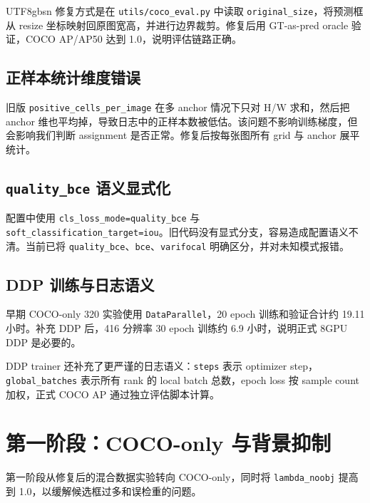 \documentclass[11pt,a4paper]{article}
\begin{document}
\begin{CJK*}{UTF8}{gbsn}
修复方式是在 \texttt{utils/coco\_eval.py} 中读取 \texttt{original\_size}，将预测框从 resize 坐标映射回原图宽高，并进行边界裁剪。修复后用 GT-as-pred oracle 验证，COCO AP/AP50 达到 1.0，说明评估链路正确。

\subsection{正样本统计维度错误}

旧版 \texttt{positive\_cells\_per\_image} 在多 anchor 情况下只对 H/W 求和，然后把 anchor 维也平均掉，导致日志中的正样本数被低估。该问题不影响训练梯度，但会影响我们判断 assignment 是否正常。修复后按每张图所有 grid 与 anchor 展平统计。

\subsection{\texttt{quality\_bce} 语义显式化}

配置中使用 \texttt{cls\_loss\_mode=quality\_bce} 与 \texttt{soft\_classification\_target=iou}。旧代码没有显式分支，容易造成配置语义不清。当前已将 \texttt{quality\_bce}、\texttt{bce}、\texttt{varifocal} 明确区分，并对未知模式报错。

\subsection{DDP 训练与日志语义}

早期 COCO-only 320 实验使用 \texttt{DataParallel}，20 epoch 训练和验证合计约 19.11 小时。补充 DDP 后，416 分辨率 30 epoch 训练约 6.9 小时，说明正式 8GPU DDP 是必要的。

DDP trainer 还补充了更严谨的日志语义：\texttt{steps} 表示 optimizer step，\texttt{global\_batches} 表示所有 rank 的 local batch 总数，epoch loss 按 sample count 加权，正式 COCO AP 通过独立评估脚本计算。

\section{第一阶段：COCO-only 与背景抑制}

第一阶段从修复后的混合数据实验转向 COCO-only，同时将 \texttt{lambda\_noobj} 提高到 1.0，以缓解候选框过多和误检重的问题。


\end{CJK*}
\end{document}
